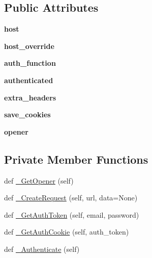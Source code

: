 \subsection*{Public Attributes}
\begin{DoxyCompactItemize}
\item 
\mbox{\label{classupload_1_1_abstract_rpc_server_ab7188d827e2faddcf970f524f5856192}} 
{\bfseries host}
\item 
\mbox{\label{classupload_1_1_abstract_rpc_server_a783a4a7e4ffb776a57a3f267300a213b}} 
{\bfseries host\+\_\+override}
\item 
\mbox{\label{classupload_1_1_abstract_rpc_server_aee0090a3bcf07b913a7dd596a5dabb8f}} 
{\bfseries auth\+\_\+function}
\item 
\mbox{\label{classupload_1_1_abstract_rpc_server_a692955750c802e461c6336d3000cd365}} 
{\bfseries authenticated}
\item 
\mbox{\label{classupload_1_1_abstract_rpc_server_adbbf0109afc13d58d7815fa143cb779f}} 
{\bfseries extra\+\_\+headers}
\item 
\mbox{\label{classupload_1_1_abstract_rpc_server_affe342205c4647d41b127f5a5634858b}} 
{\bfseries save\+\_\+cookies}
\item 
\mbox{\label{classupload_1_1_abstract_rpc_server_aa931446476e0e86f3ade7fef0a0aea5a}} 
{\bfseries opener}
\end{DoxyCompactItemize}
\subsection*{Private Member Functions}
\begin{DoxyCompactItemize}
\item 
def \mbox{\hyperlink{classupload_1_1_abstract_rpc_server_a388a9974eab1157ba4785e2ab2c33be9}{\+\_\+\+Get\+Opener}} (self)
\item 
def \mbox{\hyperlink{classupload_1_1_abstract_rpc_server_a1553c79619eec0770932cd4fa325243c}{\+\_\+\+Create\+Request}} (self, url, data=None)
\item 
def \mbox{\hyperlink{classupload_1_1_abstract_rpc_server_a5a801cc3fdbb8222fa58d41e098f70a7}{\+\_\+\+Get\+Auth\+Token}} (self, email, password)
\item 
def \mbox{\hyperlink{classupload_1_1_abstract_rpc_server_a45ba7a36fd840608f532694be6b6a9ae}{\+\_\+\+Get\+Auth\+Cookie}} (self, auth\+\_\+token)
\item 
def \mbox{\hyperlink{classupload_1_1_abstract_rpc_server_a8517a9d90ee2478752a53302f01d868d}{\+\_\+\+Authenticate}} (self)
\end{DoxyCompactItemize}


